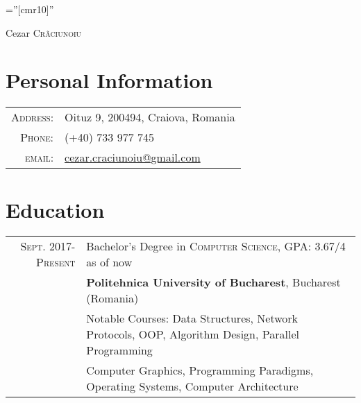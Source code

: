 \documentclass[a4paper,10pt]{article}
\begin{document}
\pagestyle{empty} %
\font\fb=''[cmr10]'' %

\par{\centering
		{\LARGE {Cezar \textsc{Cr\~{a}ciunoiu}}
	}\bigskip\par}

\section{Personal Information}

\begin{tabular}{rl}
    \textsc{Address:}   & Oituz 9, 200494, Craiova, Romania \\
    \textsc{Phone:}     & (+40) 733 977 745\\
    \textsc{email:}     & \href{mailto:cezar.craciunoiu@gmail.com}{cezar.craciunoiu@gmail.com}
\end{tabular}


\section{Education}
\begin{tabular}{rl}	
\textsc{Sept.} 2017-\textsc{Present}& Bachelor's Degree in \textsc{Computer Science}, GPA: 3.67/4 \scriptsize{as of now}\\&
\normalsize\textbf{Politehnica University of Bucharest}, Bucharest (Romania)\\&
\footnotesize{Notable Courses: Data Structures, Network Protocols, OOP,
				 Algorithm Design, Parallel Programming} \\& \footnotesize{Computer Graphics, Programming Paradigms,
				 Operating Systems, Computer Architecture}
\end{tabular}

\end{document}
